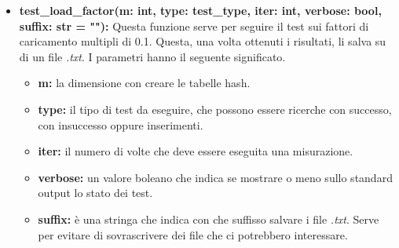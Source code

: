 \documentclass{article}
\newcommand{\newlineitem}[1]{\item \textbf{#1} \hfill \break}
\begin{document}
\begin{itemize}
\newlineitem{test\_load\_factor(m: int, type: test\_type, iter: int, verbose: bool, suffix: str = ""):}
Questa funzione serve per seguire il test sui fattori di caricamento multipli di 0.1. Questa, una volta ottenuti i risultati, li salva su di un file \emph{.txt}. I parametri hanno il seguente significato.

\begin{itemize}
\item \textbf{m:} la dimensione con creare le tabelle hash.
\item \textbf{type:} il tipo di test da eseguire, che possono essere ricerche con successo, con insuccesso oppure inserimenti.
\item \textbf{iter:} il numero di volte che deve essere eseguita una misurazione.
\item \textbf{verbose:} un valore boleano che indica se mostrare o meno sullo standard output lo stato dei test.
\item \textbf{suffix:} è una stringa che indica con che suffisso salvare i file \emph{.txt}. Serve per evitare di sovrascrivere dei file che ci potrebbero interessare.
\end{itemize}
\end{itemize}
\end{document}
